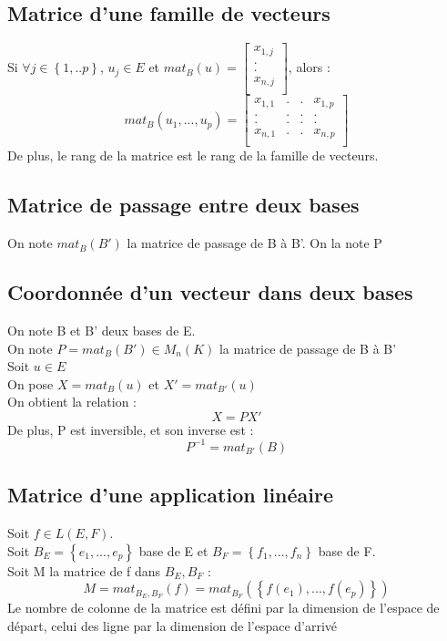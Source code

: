 \subsection{Matrice d'une famille de vecteurs}
\begin{de}
 Si $ \forall j \in \left\{1,..p\right\}$, $u_j \in E$ et $mat_B(u)= \begin{bmatrix}
x_{1,j}\\
.\\
.\\
x_{n,j}\\
\end{bmatrix}$, alors :
$$mat_B(u_1,...,u_p) = \begin{bmatrix}
x_{1,1} & . & . & x_{1,p}\\
. & . & . & .\\
. & . & . & . \\
x_{n,1} & . & . & x_{n,p}\\
\end{bmatrix}$$
De plus, le rang de la matrice est le rang de la famille de vecteurs.
\end{de}
\subsection{Matrice de passage entre deux bases}
\begin{de}
 On note $mat_B(B')$ la matrice de passage de B à B'. On la note P
\end{de}
\subsection{Coordonnée d'un vecteur dans deux bases}
\begin{de}
On note B et B' deux bases de E.\\
On note $P=mat_B(B') \in M_n(K)$ la matrice de passage de B à B'\\
Soit $u \in E$\\
On pose $X=mat_B(u)$ et $X'=mat_{B'}(u)$ \\
On obtient la relation :
$$X = PX'$$
De plus, P est inversible, et son inverse est : 
$$P^{-1}=mat_{B'}(B)$$
\end{de}
\subsection{Matrice d'une application linéaire}
\begin{de}
Soit $f \in L(E,F)$. \\
Soit $B_E = \left\{e_1,...,e_p\right\}$ base de E et  $B_F = \left\{f_1,...,f_n\right\}$ base de F.\\
Soit M la matrice de f dans $B_E,B_F$ :
$$M = mat_{B_E,B_F}(f) = mat_{B_F}(\left\{f(e_1),...,f(e_p)\right\})$$
Le nombre de colonne de la matrice est défini par la dimension de l'espace de départ, celui des ligne par la dimension de l'espace d'arrivé
\end{de}
